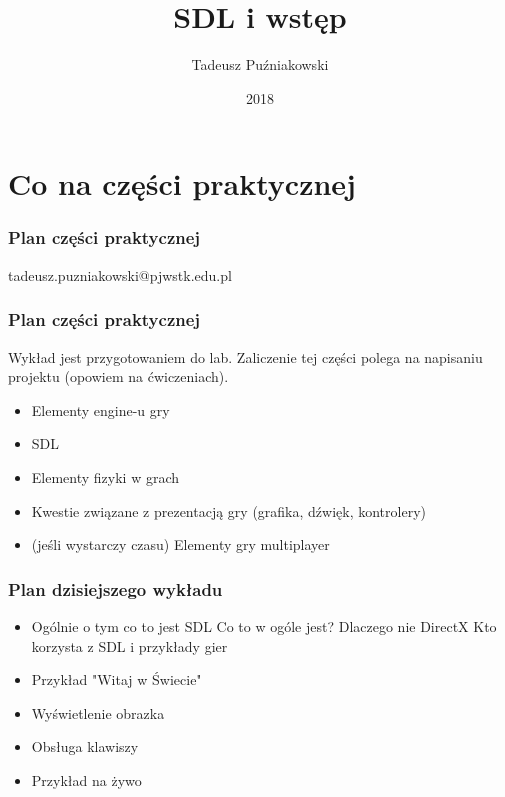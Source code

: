 \documentclass{beamer}
\title[SGD 1]{SDL i wstęp}
\author{Tadeusz Puźniakowski}
\institute{PJATK}
\date{2018}
\begin{document}


\frame{\titlepage}

\section{Co na części praktycznej}

\begin{frame}[fragile]
    \frametitle{Plan części praktycznej}
    tadeusz.puzniakowski@pjwstk.edu.pl
    \EB
\end{frame}

\begin{frame}[fragile]
    \frametitle{Plan części praktycznej}
        Wykład jest przygotowaniem do lab. Zaliczenie tej części polega na napisaniu projektu (opowiem na ćwiczeniach).
        \begin{itemize}
        \item Elementy engine-u gry
        \item SDL
        \item Elementy fizyki w grach
        \item Kwestie związane z prezentacją gry (grafika, dźwięk, kontrolery)
        \item (jeśli wystarczy czasu) Elementy gry multiplayer
        \end{itemize}
    \EB
\end{frame}


\begin{frame}[fragile]
    \frametitle{Plan dzisiejszego wykładu}
        \begin{itemize}
        \item Ogólnie o tym co to jest SDL
        \BI
           \I Co to w ogóle jest?
           \I Dlaczego nie DirectX
           \I Kto korzysta z SDL i przykłady gier
        \EI
        \item Przykład "Witaj w Świecie"
        \item Wyświetlenie obrazka
        \item Obsługa klawiszy
        \item Przykład na żywo
        \end{itemize}
    \EB
\end{frame}
    
\end{document}
